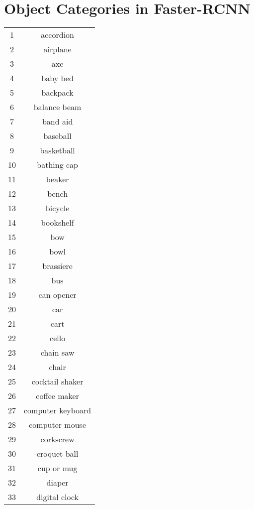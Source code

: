 \section{Object Categories in Faster-RCNN}
\footnotesize
\begin{multicols*}{4}
\let\mcnewpage=\newpage
\makeatletter
\renewcommand\newpage{%
        \if@firstcolumn
                \hrule width\linewidth height0pt
                \columnbreak
        \else
                \mcnewpage
        \fi
}
\makeatother
{}
\begin{supertabular}{c|c}
\shrinkheight{-.3em}
1   & accordion \\
2   & airplane \\
3   & axe \\
4   & baby bed \\
5   & backpack \\
6   & balance beam \\
7   & band aid \\
8   & baseball \\
9   & basketball \\
10  & bathing cap \\
11  & beaker \\
12  & bench \\
13  & bicycle \\
14  & bookshelf \\
15  & bow \\
16  & bowl \\
17  & brassiere \\
18  & bus \\
19  & can opener \\
20  & car \\
21  & cart \\
22  & cello \\
23  & chain saw \\
24  & chair \\
25  & cocktail shaker \\
26  & coffee maker \\
27  & computer keyboard \\
28  & computer mouse \\
29  & corkscrew \\
30  & croquet ball \\
31  & cup or mug \\
32  & diaper \\
33  & digital clock \\

\end{supertabular}
\end{multicols*}

